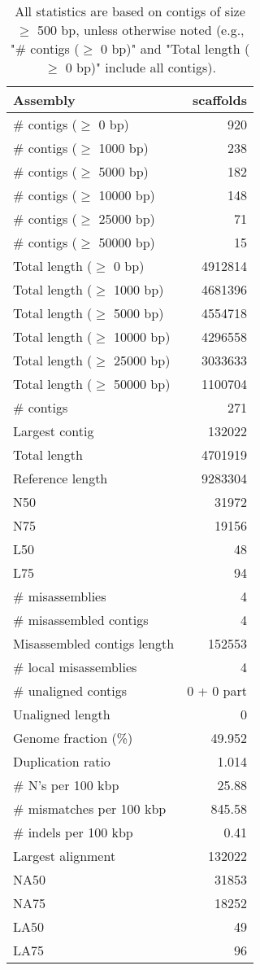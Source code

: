 \documentclass[12pt,a4paper]{article}
\begin{document}
\begin{table}[ht]
\begin{center}
\caption{All statistics are based on contigs of size $\geq$ 500 bp, unless otherwise noted (e.g., "\# contigs ($\geq$ 0 bp)" and "Total length ($\geq$ 0 bp)" include all contigs).}
\begin{tabular}{|l*{1}{|r}|}
\hline
Assembly & scaffolds \\ \hline
\# contigs ($\geq$ 0 bp) & 920 \\ \hline
\# contigs ($\geq$ 1000 bp) & 238 \\ \hline
\# contigs ($\geq$ 5000 bp) & 182 \\ \hline
\# contigs ($\geq$ 10000 bp) & 148 \\ \hline
\# contigs ($\geq$ 25000 bp) & 71 \\ \hline
\# contigs ($\geq$ 50000 bp) & 15 \\ \hline
Total length ($\geq$ 0 bp) & 4912814 \\ \hline
Total length ($\geq$ 1000 bp) & 4681396 \\ \hline
Total length ($\geq$ 5000 bp) & 4554718 \\ \hline
Total length ($\geq$ 10000 bp) & 4296558 \\ \hline
Total length ($\geq$ 25000 bp) & 3033633 \\ \hline
Total length ($\geq$ 50000 bp) & 1100704 \\ \hline
\# contigs & 271 \\ \hline
Largest contig & 132022 \\ \hline
Total length & 4701919 \\ \hline
Reference length & 9283304 \\ \hline
N50 & 31972 \\ \hline
N75 & 19156 \\ \hline
L50 & 48 \\ \hline
L75 & 94 \\ \hline
\# misassemblies & 4 \\ \hline
\# misassembled contigs & 4 \\ \hline
Misassembled contigs length & 152553 \\ \hline
\# local misassemblies & 4 \\ \hline
\# unaligned contigs & 0 + 0 part \\ \hline
Unaligned length & 0 \\ \hline
Genome fraction (\%) & 49.952 \\ \hline
Duplication ratio & 1.014 \\ \hline
\# N's per 100 kbp & 25.88 \\ \hline
\# mismatches per 100 kbp & 845.58 \\ \hline
\# indels per 100 kbp & 0.41 \\ \hline
Largest alignment & 132022 \\ \hline
NA50 & 31853 \\ \hline
NA75 & 18252 \\ \hline
LA50 & 49 \\ \hline
LA75 & 96 \\ \hline
\end{tabular}
\end{center}
\end{table}
\end{document}
